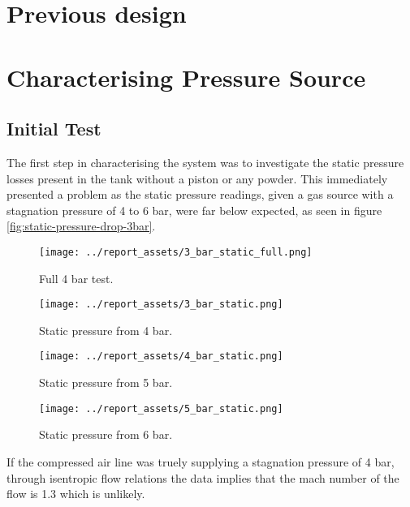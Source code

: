 \section{Previous design}\label{sec:prev-design-analysis}
\section{Characterising Pressure Source}\label{sec:static_test}
\subsection{Initial Test}
The first step in characterising the system was to investigate the static pressure losses present in the tank without a piston or any powder. This immediately presented a problem as the static pressure readings, given a gas source with a stagnation pressure of 4 to 6 bar, were far below expected, as seen in figure \autoref{fig:static-pressure-drop-3bar}. 
\begin{figure}[htbp]
    \centering

    \begin{minipage}{0.45\textwidth}
        \centering
        \texttt{[image: ../report\_assets/3\_bar\_static\_full.png]}
        \caption{Full 4 bar test.}\label{fig:static-pressure-drop-3bar_full}
    \end{minipage}
    \hfill
    \begin{minipage}{0.45\textwidth}
        \centering
        \texttt{[image: ../report\_assets/3\_bar\_static.png]}
        \caption{Static pressure from 4 bar.}\label{fig:static-pressure-drop-3bar}
    \end{minipage}
    \begin{minipage}{0.45\textwidth}
        \centering
        \texttt{[image: ../report\_assets/4\_bar\_static.png]}
        \caption{Static pressure from 5 bar.}\label{fig:static-pressure-drop-4bar}
    \end{minipage}
    \hfill
    \begin{minipage}{0.45\textwidth}
        \centering
        \texttt{[image: ../report\_assets/5\_bar\_static.png]}
        \caption{Static pressure from 6 bar.}\label{fig:static-pressure-drop-5bar}
    \end{minipage}


\end{figure}
If the compressed air line was truely supplying a stagnation pressure of 4 bar, through isentropic flow relations the data implies that the mach number of the flow is 1.3 which is unlikely.

